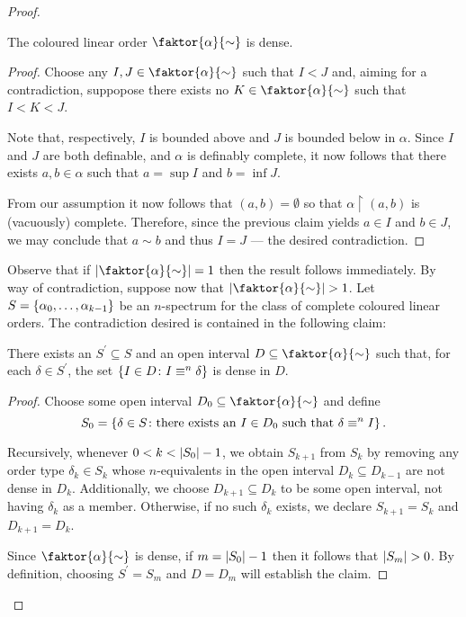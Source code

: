 \begin{proof}
	\begin{claim}
		The coloured linear order $\faktor{\alpha}{\sim}$ is dense.
	\end{claim}
	\begin{proof}
		Choose any $I,J\in\faktor{\alpha}{\sim}$ such that $I<J$ and, aiming for a contradiction, suppopose there exists no $K\in\faktor{\alpha}{\sim}$ such that $I<K<J$.

		Note that, respectively, $I$ is bounded above and $J$ is bounded below in $\alpha$.  Since $I$ and $J$ are both definable, and $\alpha$ is definably complete, it now follows that there exists $a,b\in\alpha$ such that $a=\sup I$ and $b=\inf J$.

		From our assumption it now follows that $(a,b)=\emptyset$ so that $\alpha\restriction(a,b)$ is (vacuously) complete.  Therefore, since the previous claim yields $a\in I$ and $b\in J$, we may conclude that $a\sim b$ and thus $I=J$ --- the desired contradiction.
	\end{proof}

	Observe that if $\card{\faktor{\alpha}{\sim}}=1$ then the result follows immediately.  By way of contradiction, suppose now that $\card{\faktor{\alpha}{\sim}}>1$.  Let $S=\left\lbrace \alpha_0,\dotsc,\alpha_{k-1}\right\rbrace$ be an $n$-spectrum for the class of complete coloured linear orders. The contradiction desired is contained in the following claim:
	\begin{claim}
		There exists an $S^\prime\subseteq S$ and an open interval $D\subseteq\faktor{\alpha}{\sim}$ such that, for each $\delta\in S^\prime$, the set $\left\lbrace I\in D\colon I\equiv^{n}\delta \right\rbrace$ is dense in $D$.
	\end{claim}
	\begin{proof}
		Choose some open interval $D_0\subseteq\faktor{\alpha}{\sim}$ and define
		\begin{equation}
			S_0=\left\lbrace \delta\in S\colon \text{there exists an }I\in D_0\text{ such that }\delta\equiv^{n}I \right\rbrace.
		\end{equation}

		Recursively, whenever $0<k<\left\lvert S_0\right\rvert-1$, we obtain $S_{k+1}$ from $S_k$ by removing any order type $\delta_k\in S_k$ whose $n$-equivalents in the open interval $D_k\subseteq D_{k-1}$ are not dense in $D_k$.  Additionally, we choose $D_{k+1}\subseteq D_k$ to be some open interval, not having $\delta_k$ as a member.  Otherwise, if no such $\delta_k$ exists, we declare $S_{k+1}=S_k$ and $D_{k+1}=D_k$.

		Since $\faktor{\alpha}{\sim}$ is dense, if $m=\left\lvert S_0\right\rvert-1$ then it follows that $\left\lvert S_m\right\rvert>0$.  By definition, choosing $S^\prime=S_m$ and $D=D_m$ will establish the claim.
	\end{proof}


\end{proof}

